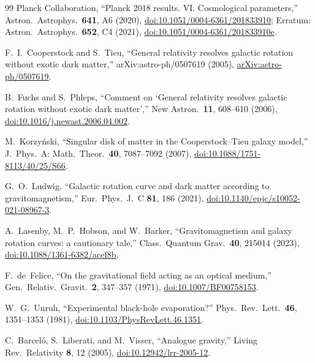 \documentclass[aps,reprint,amsmath,amssymb,nofootinbib,superscriptaddress,floatfix]{revtex4-2}
\begin{document}
\begin{thebibliography}{99}
Planck Collaboration, ``Planck 2018 results. VI. Cosmological
parameters,'' Astron.\ Astrophys.\ \textbf{641}, A6 (2020),
\href{https://doi.org/10.1051/0004-6361/201833910}
{doi:10.1051/0004-6361/201833910};
Erratum: Astron.\ Astrophys.\ \textbf{652}, C4 (2021),
\href{https://doi.org/10.1051/0004-6361/201833910e}
{doi:10.1051/0004-6361/201833910e}.

F.~I.~Cooperstock and S.~Tieu, ``General relativity resolves galactic
rotation without exotic dark matter,'' arXiv:astro-ph/0507619 (2005),
\href{https://arxiv.org/abs/astro-ph/0507619}
{arXiv:astro-ph/0507619}.

B.~Fuchs and S.~Phleps, ``Comment on `General relativity resolves
galactic rotation without exotic dark matter','' New Astron.\
\textbf{11}, 608--610 (2006),
\href{https://doi.org/10.1016/j.newast.2006.04.002}
{doi:10.1016/j.newast.2006.04.002}.

M.~Korzy\'nski, ``Singular disk of matter in the Cooperstock--Tieu
galaxy model,'' J.\ Phys.\ A: Math.\ Theor.\ \textbf{40}, 7087--7092
(2007),
\href{https://doi.org/10.1088/1751-8113/40/25/S66}
{doi:10.1088/1751-8113/40/25/S66}.

G.~O.~Ludwig, ``Galactic rotation curve and dark matter according to
gravitomagnetism,'' Eur.\ Phys.\ J.\ C \textbf{81}, 186 (2021),
\href{https://doi.org/10.1140/epjc/s10052-021-08967-3}
{doi:10.1140/epjc/s10052-021-08967-3}.

A.~Lasenby, M.~P.~Hobson, and W.~Barker, ``Gravitomagnetism and galaxy
rotation curves: a cautionary tale,'' Class.\ Quantum Grav.\
\textbf{40}, 215014 (2023),
\href{https://doi.org/10.1088/1361-6382/acef8b}
{doi:10.1088/1361-6382/acef8b}.

F.~de~Felice, ``On the gravitational field acting as an optical
medium,'' Gen.\ Relativ.\ Gravit.\ \textbf{2}, 347--357 (1971),
\href{https://doi.org/10.1007/BF00758153}{doi:10.1007/BF00758153}.

\bibitem{Unruh1981}
W.~G.~Unruh, ``Experimental black-hole evaporation?''
Phys.\ Rev.\ Lett.\ \textbf{46}, 1351--1353 (1981),
\href{https://doi.org/10.1103/PhysRevLett.46.1351}
{doi:10.1103/PhysRevLett.46.1351}.

C.~Barcel\'o, S.~Liberati, and M.~Visser, ``Analogue gravity,''
Living Rev.\ Relativity \textbf{8}, 12 (2005),
\href{https://doi.org/10.12942/lrr-2005-12}{doi:10.12942/lrr-2005-12}.


\end{thebibliography}
\end{document}
